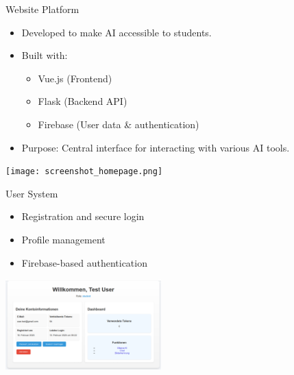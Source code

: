 \documentclass{beamer}
\begin{document}
\begin{frame}{Website Platform}
  \begin{itemize}
    \item Developed to make AI accessible to students.
    \item Built with:
    \begin{itemize}
      \item Vue.js (Frontend)
      \item Flask (Backend API)
      \item Firebase (User data \& authentication)
    \end{itemize}
    \item Purpose: Central interface for interacting with various AI tools.
  \end{itemize}
  \vspace{0.5cm}
  \centering
  \texttt{[image: screenshot\_homepage.png]} %
\end{frame}

\begin{frame}{User System}
  \begin{itemize}
    \item Registration and secure login
    \item Profile management
    \item Firebase-based authentication
  \end{itemize}
  \vspace{0.5cm}
  \centering
  \includegraphics[height=3.5cm]{Account-Managment.png} %
\end{frame}
\end{document}
